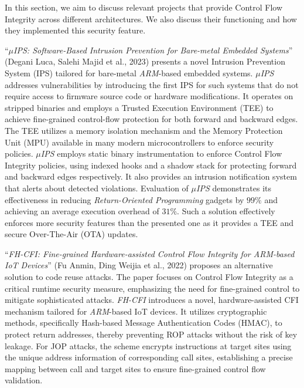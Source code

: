 In this section, we aim to discuss relevant projects that provide Control Flow
Integrity across different architectures. We also discuss their functioning and how
they implemented this security feature.

``\textit{$\mu$IPS: Software-Based Intrusion Prevention for Bare-metal Embedded
Systems}'' (Degani Luca, Salehi Majid et al., 2023)\cite{Degani} presents a
novel Intrusion Prevention System (IPS) tailored for bare-metal \textit{ARM}-based
embedded systems. \textit{$\mu$IPS} addresses vulnerabilities by introducing the
first IPS for such systems that do not require access to firmware source code or
hardware modifications. It operates on stripped binaries and employs a Trusted
Execution Environment (TEE) to achieve fine-grained control-flow protection for
both forward and backward edges. The TEE utilizes a memory isolation mechanism and
the Memory Protection Unit (MPU) available in many modern microcontrollers to enforce
security policies. \textit{$\mu$IPS} employs static binary instrumentation to enforce
Control Flow Integrity policies, using indexed hooks and a shadow stack for
protecting forward and backward edges respectively. It also provides an intrusion
notification system that alerts about detected violations. Evaluation of \textit{$\mu$IPS}
demonstrates its effectiveness in reducing \textit{Return-Oriented Programming}
gadgets by $99\%$ and achieving an average execution overhead of $31\%$. Such a solution
effectively enforces more security features than the presented one as it provides
a TEE and secure Over-The-Air (OTA) updates.

``\textit{FH-CFI: Fine-grained Hardware-assisted Control Flow Integrity for ARM-based
IoT Devices}'' (Fu Anmin, Ding Weijia et al., 2022)\cite{fhcfi} proposes an
alternative solution to code reuse attacks. The paper focuses on Control Flow Integrity
as a critical runtime security measure, emphasizing the need for fine-grained
control to mitigate sophisticated attacks. \textit{FH-CFI} introduces a novel, hardware-assisted
CFI mechanism tailored for \textit{ARM}-based IoT devices. It utilizes cryptographic
methods, specifically Hash-based Message Authentication Codes (HMAC), to protect
return addresses, thereby preventing ROP attacks without the risk of key leakage.
For JOP attacks, the scheme encrypts instructions at target sites using the
unique address information of corresponding call sites, establishing a precise mapping
between call and target sites to ensure fine-grained control flow validation.

